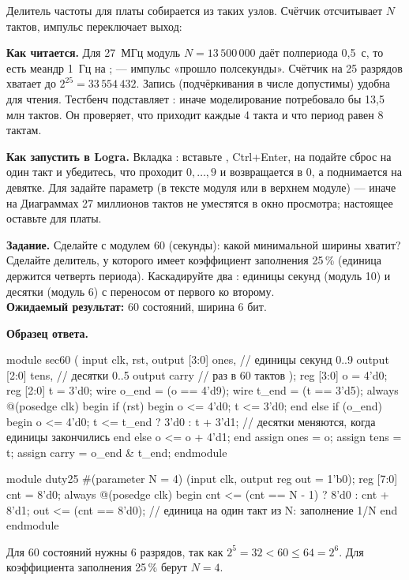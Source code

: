 Делитель частоты для платы собирается из таких узлов. Счётчик отсчитывает
$N$ тактов, импульс переключает выход:


\textbf{Как читается.} Для 27~МГц модуль $N=13\,500\,000$ даёт полпериода
0,5~с, то есть меандр 1~Гц на ;  --- импульс «прошло полсекунды».
Счётчик  на 25 разрядов хватает до $2^{25}=33\,554\,432$. Запись
 (подчёркивания в числе допустимы) удобна для чтения.
Тестбенч  подставляет : иначе
моделирование потребовало бы 13,5 млн тактов. Он проверяет, что 
приходит каждые 4 такта и что период  равен 8 тактам.

\textbf{Как запустить в Logra.} Вкладка : вставьте ,
Ctrl+Enter, на  подайте сброс на один такт и убедитесь, что
 проходит $0,\ldots,9$ и возвращается в 0, а  поднимается на
девятке. Для  задайте параметр  (в тексте модуля
или в верхнем модуле) --- иначе на Диаграммах 27 миллионов тактов не уместятся
в окно просмотра; настоящее  оставьте для платы.

\begin{diybox}
\textbf{Задание.}  Сделайте  с модулем 60 (секунды):
какой минимальной ширины  хватит?  Сделайте делитель, у
которого  имеет коэффициент заполнения 25\,\% (единица держится четверть
периода).  Каскадируйте два : единицы секунд (модуль
10) и десятки (модуль 6) с переносом от первого ко второму.\\
\textbf{Ожидаемый результат:} 60 состояний, ширина 6 бит.
\end{diybox}

\textbf{Образец ответа.}
\begin{vcode}
module sec60 (
    input        clk, rst,
    output [3:0] ones,     // единицы секунд 0..9
    output [2:0] tens,     // десятки 0..5
    output       carry     // раз в 60 тактов
);
    reg [3:0] o = 4'd0;
    reg [2:0] t = 3'd0;
    wire o_end = (o == 4'd9);
    wire t_end = (t == 3'd5);
    always @(posedge clk) begin
        if (rst) begin o <= 4'd0; t <= 3'd0; end
        else if (o_end) begin
            o <= 4'd0;
            t <= t_end ? 3'd0 : t + 3'd1;    // десятки меняются, когда единицы закончились
        end else o <= o + 4'd1;
    end
    assign ones  = o;
    assign tens  = t;
    assign carry = o_end & t_end;
endmodule

module duty25 #(parameter N = 4) (input clk, output reg out = 1'b0);
    reg [7:0] cnt = 8'd0;
    always @(posedge clk) begin
        cnt <= (cnt == N - 1) ? 8'd0 : cnt + 8'd1;
        out <= (cnt == 8'd0);               // единица на один такт из N: заполнение 1/N
    end
endmodule
\end{vcode}
Для 60 состояний нужны 6 разрядов, так как $2^5=32<60\le 64=2^6$. Для коэффициента заполнения
25\,\% берут $N=4$.

